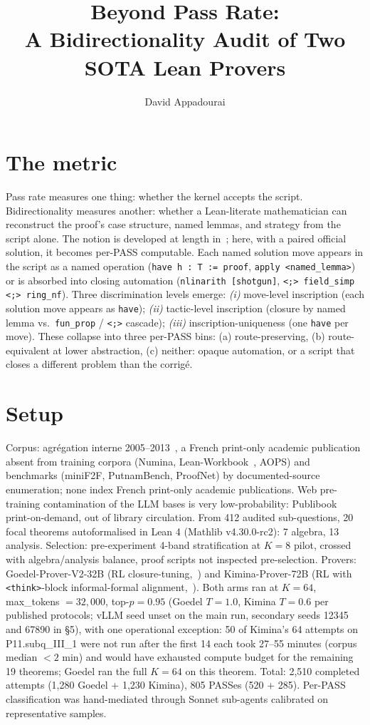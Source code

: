 \documentclass{easychair}
\title{Beyond Pass Rate: \\
A Bidirectionality Audit of Two SOTA Lean Provers}
\author{David Appadourai}
\institute{Universit\`a di Roma Tor Vergata, Italy}
\begin{document}
\maketitle

\section{The metric}

Pass rate measures one thing: whether the kernel accepts the script. Bidirectionality measures another: whether a Lean-literate mathematician can reconstruct the proof's case structure, named lemmas, and strategy from the script alone. The notion is developed at length in~\cite{appadourai-wdwft}; here, with a paired official solution, it becomes per-PASS computable. Each named solution move appears in the script as a named operation (\texttt{have h\,:\,T := proof}, \texttt{apply <named\_lemma>}) or is absorbed into closing automation (\texttt{nlinarith [shotgun]}, \texttt{<;> field\_simp <;> ring\_nf}). Three discrimination levels emerge: \emph{(i)} move-level inscription (each solution move appears as \texttt{have}); \emph{(ii)} tactic-level inscription (closure by named lemma vs.\ \texttt{fun\_prop} / \texttt{<;>} cascade); \emph{(iii)} inscription-uniqueness (one \texttt{have} per move). These collapse into three per-PASS bins: (a) route-preserving, (b) route-equivalent at lower abstraction, (c) neither: opaque automation, or a script that closes a different problem than the corrig\'e.

\section{Setup}

Corpus: agr\'egation interne 2005--2013~\cite{mercier-rombaldi}, a French print-only academic publication absent from training corpora (Numina, Lean-Workbook~\cite{leanworkbook}, AOPS) and benchmarks (miniF2F, PutnamBench, ProofNet) by documented-source enumeration; none index French print-only academic publications. Web pre-training contamination of the LLM bases is very low-probability: Publibook print-on-demand, out of library circulation. From 412 audited sub-questions, 20 focal theorems autoformalised in Lean 4 (Mathlib v4.30.0-rc2): 7 algebra, 13 analysis. Selection: pre-experiment 4-band stratification at $K{=}8$ pilot, crossed with algebra/analysis balance, proof scripts not inspected pre-selection. Provers: Goedel-Prover-V2-32B (RL closure-tuning,~\cite{goedelv2}) and Kimina-Prover-72B (RL with \texttt{<think>}-block informal-formal alignment,~\cite{kimina}). Both arms ran at $K = 64$, max\_tokens $= 32{,}000$, top-$p = 0.95$ (Goedel $T=1.0$, Kimina $T=0.6$ per published protocols; vLLM seed unset on the main run, secondary seeds 12345 and 67890 in \S5), with one operational exception: 50 of Kimina's 64 attempts on P11.subq\_III\_1 were not run after the first 14 each took 27--55 minutes (corpus median $<2$ min) and would have exhausted compute budget for the remaining 19 theorems; Goedel ran the full $K=64$ on this theorem. Total: 2,510 completed attempts (1,280 Goedel + 1,230 Kimina), 805 PASSes (520 + 285). Per-PASS classification was hand-mediated through Sonnet sub-agents calibrated on representative samples.
\end{document}
